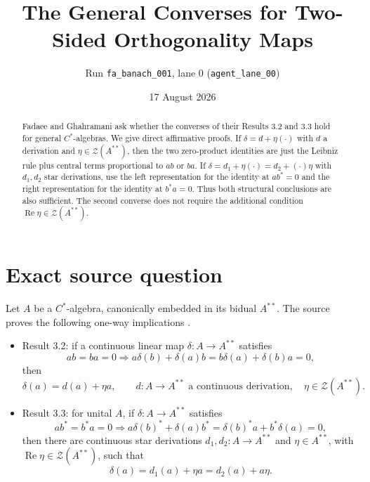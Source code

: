 \documentclass[11pt]{article}
\title{The General Converses for Two-Sided Orthogonality Maps}
\author{Run \texttt{fa\_banach\_001}, lane 0
  (\texttt{agent\_lane\_00})}
\date{17 August 2026}
\newcommand{\Z}{\mathcal Z}
\begin{document}
\maketitle

\begin{abstract}
Fadaee and Ghahramani ask whether the converses of their Results 3.2 and
3.3 hold for general $C^*$-algebras.  We give direct affirmative proofs.
If $\delta=d+\eta(\cdot)$ with $d$ a derivation and
$\eta\in\Z(A^{**})$, then the two zero-product identities are just the
Leibniz rule plus central terms proportional to $ab$ or $ba$.  If
$\delta=d_1+\eta(\cdot)=d_2+(\cdot)\eta$ with $d_1,d_2$ star derivations,
use the left representation for the identity at $ab^*=0$ and the right
representation for the identity at $b^*a=0$.  Thus both structural
conclusions are also sufficient.  The second converse does not require the
additional condition $\operatorname{Re}\eta\in\Z(A^{**})$.
\end{abstract}

\noindent{}

\section{Exact source question}

Let $A$ be a $C^*$-algebra, canonically embedded in its bidual $A^{**}$.
The source proves the following one-way implications \cite{source}.

\begin{itemize}
\item Result 3.2: if a continuous linear map $\delta:A\to A^{**}$ satisfies
\[
 ab=ba=0\Longrightarrow
 a\delta(b)+\delta(a)b=b\delta(a)+\delta(b)a=0,
\]
then
\[
 \delta(a)=d(a)+\eta a,
 \qquad d:A\to A^{**}\text{ a continuous derivation},\quad
 \eta\in\Z(A^{**}).                                      \tag{R3.2}
\]
\item Result 3.3: for unital $A$, if $\delta:A\to A^{**}$ satisfies
\[
 ab^*=b^*a=0\Longrightarrow
 a\delta(b)^*+\delta(a)b^*
 =\delta(b)^*a+b^*\delta(a)=0,
\]
then there are continuous star derivations $d_1,d_2:A\to A^{**}$ and
$\eta\in A^{**}$, with $\operatorname{Re}\eta\in\Z(A^{**})$, such that
\[
 \delta(a)=d_1(a)+\eta a=d_2(a)+a\eta.                   \tag{R3.3}
\]
\end{itemize}
\end{document}
